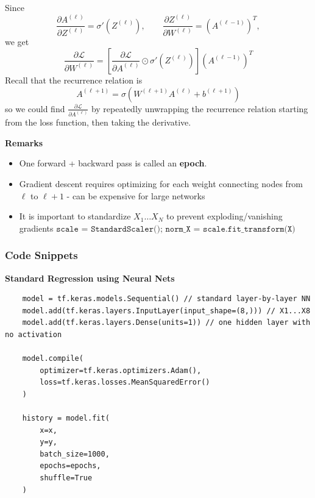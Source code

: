 \documentclass{article}
\begin{document}
Since
\[
    \frac{\partial A^{(\ell)}}{\partial Z^{(\ell)}}
    =
    \sigma'\left(Z^{(\ell)}\right),
    \qquad
    \frac{\partial Z^{(\ell)}}{\partial W^{(\ell)}}
    =
    \left(A^{(\ell - 1)}\right)^T,
\]
we get
\[
    \boxed{
    \frac{\partial \mathcal{L}}{\partial W^{(\ell)}}
    =
    \left[
    \frac{\partial \mathcal{L}}{\partial A^{(\ell)}}
    \odot
    \sigma'\left(Z^{(\ell)}\right)
    \right]
    \left(A^{(\ell - 1)}\right)^T
    }
\]
Recall that the recurrence relation is  \[
    A^{(\ell+1)}
    =
    \sigma\left(W^{(\ell+1)}A^{(\ell)} + b^{(\ell+1)}\right)
\] so we could find $ \frac{\partial \mathcal{L}}{\partial A^{(\ell)}}$ by repeatedly unwrapping the recurrence relation starting from the loss function, then taking the derivative.

\textbf{Remarks}
\begin{itemize}
    \item One forward + backward pass is called an \textbf{epoch}.
    \item Gradient descent requires optimizing for each weight connecting nodes from $\ell$ to $\ell + 1$ - can be expensive for large networks
    \item It is important to standardize $X_1 \dots X_N$ to prevent exploding/vanishing gradients $\texttt{scale = StandardScaler(); norm\_X = scale.fit\_transform(X)}$
\end{itemize}
\subsubsection{Code Snippets}
\textbf{Standard Regression using Neural Nets}
\begin{verbatim}
    model = tf.keras.models.Sequential() // standard layer-by-layer NN
    model.add(tf.keras.layers.InputLayer(input_shape=(8,))) // X1...X8
    model.add(tf.keras.layers.Dense(units=1)) // one hidden layer with no activation

    model.compile(
        optimizer=tf.keras.optimizers.Adam(),
        loss=tf.keras.losses.MeanSquaredError()
    )

    history = model.fit(
        x=x,
        y=y,
        batch_size=1000,
        epochs=epochs,
        shuffle=True
    )
\end{verbatim}
\end{document}

